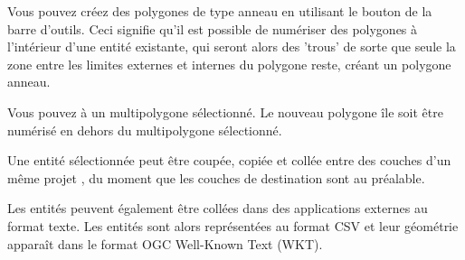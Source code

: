 
Vous pouvez créez des polygones de type anneau en utilisant le bouton  de la barre d'outils. Ceci signifie qu'il est possible de numériser des polygones à l'intérieur d'une entité existante, qui seront alors des 'trous' de sorte que seule la zone entre les limites externes et internes du polygone reste, créant un polygone anneau.


Vous pouvez  à un multipolygone sélectionné. Le nouveau polygone île soit être numérisé en dehors du multipolygone sélectionné.


Une entité sélectionnée peut être coupée, copiée et collée entre des couches d'un même projet \qg, du moment que les couches de destination sont  au préalable.

Les entités peuvent également être collées dans des applications externes au format texte. Les entités sont alors représentées au format CSV et leur géométrie apparaît dans le format OGC Well-Known Text (WKT).

